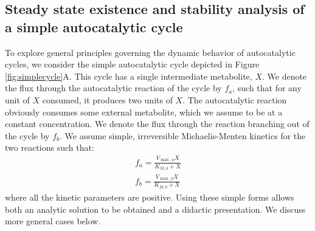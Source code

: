 \subsection{Steady state existence and stability analysis of a simple autocatalytic cycle}
To explore general principles governing the dynamic behavior of autocatalytic cycles, we consider the simple autocatalytic cycle depicted in Figure \ref{fig:simplecycle}A.
This cycle has a single intermediate metabolite, $X$.
We denote the flux through the autocatalytic reaction of the cycle by $f_a$, such that for any unit of $X$ consumed, it produces two units of $X$.
The autocatalytic reaction obviously consumes some external metabolite, which we assume to be at a constant concentration.
We denote the flux through the reaction branching out of the cycle by $f_b$.
    We assume simple, irreversible Michaelis-Menten kinetics for the two reactions such that:
    \begin{eqnarray*}
      f_a = \frac{V_{\max,a}X}{K_{M,a}+X} \\
      f_b = \frac{V_{\max,b}X}{K_{M,b}+X}
    \end{eqnarray*}
    where all the kinetic parameters are positive.
    Using these simple forms allows both an analytic solution to be obtained and a didactic presentation.
    We discuss more general cases below.
